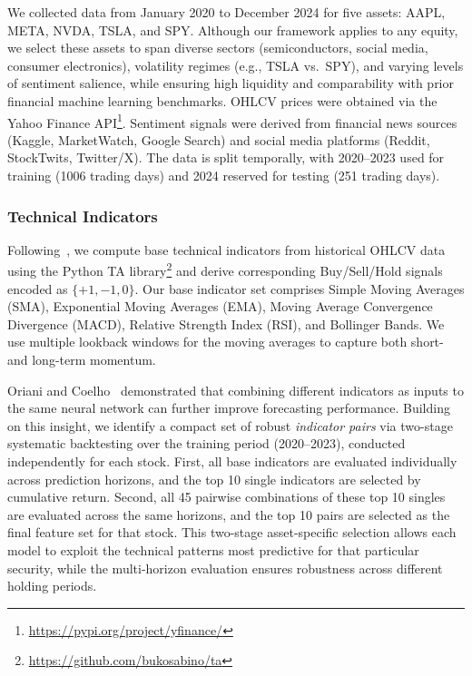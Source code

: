 \documentclass[a4paper,10pt,conference]{IEEEtran}
\begin{document}
We collected data from January 2020 to December 2024 for five assets: AAPL, META, NVDA, TSLA, and SPY. Although our framework applies to any equity, we select these assets to span diverse sectors (semiconductors, social media, consumer electronics), volatility regimes (e.g., TSLA vs.\ SPY), and varying levels of sentiment salience, while ensuring high liquidity and comparability with prior financial machine learning benchmarks. OHLCV prices were obtained via the Yahoo Finance API\footnote{\url{https://pypi.org/project/yfinance/}}. Sentiment signals were derived from financial news sources (Kaggle, MarketWatch, Google Search) and social media platforms (Reddit, StockTwits, Twitter/X). The data is split temporally, with 2020--2023 used for training (1006 trading days) and 2024 reserved for testing (251 trading days).


\subsubsection{Technical Indicators}
Following~\cite{wang2023learning}, we compute base technical indicators from historical OHLCV data using the Python TA library\footnote{\url{https://github.com/bukosabino/ta}} and derive corresponding Buy/Sell/Hold signals encoded as $\{+1,-1,0\}$. Our base indicator set comprises Simple Moving Averages (SMA), Exponential Moving Averages (EMA), Moving Average Convergence Divergence (MACD), Relative Strength Index (RSI), and Bollinger Bands. We use multiple lookback windows for the moving averages to capture both short- and long-term momentum.

Oriani and Coelho~\cite{oriani2016evaluating} demonstrated that combining different indicators as inputs to the same neural network can further improve forecasting performance. Building on this insight, we identify a compact set of robust \emph{indicator pairs} via two-stage systematic backtesting over the training period (2020--2023), conducted independently for each stock. First, all base indicators are evaluated individually across prediction horizons, and the top 10 single indicators are selected by cumulative return. Second, all 45 pairwise combinations of these top 10 singles are evaluated across the same horizons, and the top 10 pairs are selected as the final feature set for that stock. This two-stage asset-specific selection allows each model to exploit the technical patterns most predictive for that particular security, while the multi-horizon evaluation ensures robustness across different holding periods.
\end{document}
